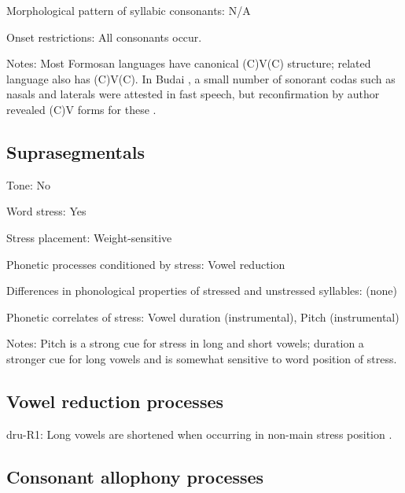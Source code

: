 {\begin{appendixdesc}
\item[Morphological pattern of syllabic consonants:] N/A

\item[Onset restrictions:] All consonants occur.

\item[Notes:] Most Formosan languages have canonical (C)V(C) structure; related language  also has (C)V(C). In Budai , a small number of sonorant codas such as nasals and laterals were attested in fast speech, but reconfirmation by author revealed (C)V forms for these \citep[213]{Chen2006}.
\end{appendixdesc}
\subsection*{Suprasegmentals}
\begin{appendixdesc}
\item[Tone:] No

\item[Word stress:] Yes

\item[Stress placement:] Weight-sensitive

\item[Phonetic processes conditioned by stress:] Vowel reduction

\item[Differences in phonological properties of stressed and unstressed syllables:] (none)

\item[Phonetic correlates of stress:] Vowel duration (instrumental), Pitch (instrumental)

\item[Notes:] Pitch is a strong cue for stress in long and short vowels; duration a stronger cue for long vowels and is somewhat sensitive to word position of stress.
\end{appendixdesc}
\subsection*{Vowel reduction processes}
\begin{appendixdesc}

\item[dru-R1:] Long vowels are shortened when occurring in non-main stress position \citep[257]{Chen2006}.
\end{appendixdesc}
\subsection*{Consonant allophony processes}
\begin{appendixdesc}


\end{appendixdesc}}
